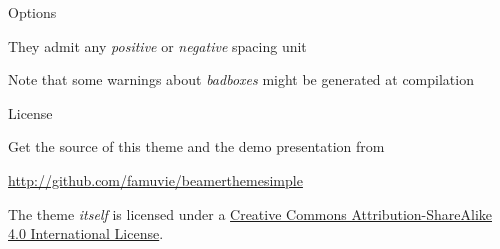 \documentclass{beamer}
\begin{document}
\begin{frame}{Options}
  
  They admit any \emph{positive} or \emph{negative} spacing \alert{unit}
  
  Note that some \alert{warnings} about \emph{badboxes} might be generated at compilation

\end{frame}




\begin{frame}{License}

  \begin{block}{Get the source of this theme and the demo presentation from}

  \begin{center}\url{http://github.com/famuvie/beamerthemesimple}\end{center}

  \end{block}
  
  The theme \emph{itself} is licensed under a
  \href{http://creativecommons.org/licenses/by-sa/4.0/}{Creative Commons
  Attribution-ShareAlike 4.0 International License}.

  \begin{center}\ccbysa\end{center}

\end{frame}
\end{document}
